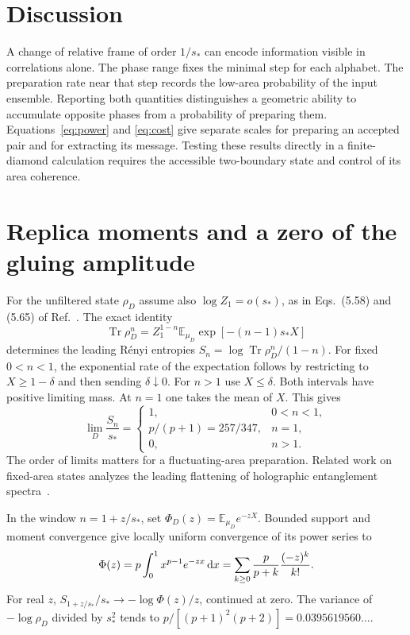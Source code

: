\documentclass[11pt,letterpaper]{article}
\newcommand{\Tr}{\operatorname{Tr}}
\newcommand{\dd}{\mathop{}\!{\rm d}}
\newcommand{\E}{\mathbb E}
\newcommand{\sg}{s_*}
\begin{document}
\section{Discussion}
A change of relative frame of order $1/\sg$ can encode information visible in correlations alone. The phase range fixes the minimal step for each alphabet. The preparation rate near that step records the low-area probability of the input ensemble. Reporting both quantities distinguishes a geometric ability to accumulate opposite phases from a probability of preparing them. Equations~\eqref{eq:power} and \eqref{eq:cost} give separate scales for preparing an accepted pair and for extracting its message. Testing these results directly in a finite-diamond calculation requires the accessible two-boundary state and control of its area coherence.

\appendix
\section{Replica moments and a zero of the gluing amplitude}
For the unfiltered state $\rho_D$ assume also $\log Z_1=o(\sg)$, as in Eqs.~(5.58) and (5.65) of Ref.~\cite{chandra}. The exact identity
\[
 \Tr\rho_D^n=Z_1^{1-n}\E_{\mu_D}\exp[-(n-1)\sg X]
\]
determines the leading R\'enyi entropies $S_n=\log\Tr\rho_D^n/(1-n)$. For fixed $0<n<1$, the exponential rate of the expectation follows by restricting to $X\geq1-\delta$ and then sending $\delta\downarrow0$. For $n>1$ use $X\leq\delta$. Both intervals have positive limiting mass. At $n=1$ one takes the mean of $X$. This gives
\begin{equation}
 \lim_{D}\frac{S_n}{\sg}=
 \begin{cases}
 1,&0<n<1,\\
 p/(p+1)=257/347,&n=1,\\
 0,&n>1 .
 \end{cases}
\end{equation}
The order of limits matters for a fluctuating-area preparation. Related work on fixed-area states analyzes the leading flattening of holographic entanglement spectra~\cite{dong}.

In the window $n=1+z/\sg$, set $\Phi_D(z)=\E_{\mu_D}e^{-zX}$. Bounded support and moment convergence give locally uniform convergence of its power series to
\begin{equation}
 \Phi(z)=p\int_0^1 x^{p-1}e^{-zx}\dd x
     =\sum_{k\geq0}\frac{p}{p+k}\frac{(-z)^k}{k!}.
\end{equation}
For real $z$, $S_{1+z/\sg}/\sg\to-\log\Phi(z)/z$, continued at zero. The variance of $-\log\rho_D$ divided by $\sg^2$ tends to $p/[(p+1)^2(p+2)]=0.0395619560\ldots$.
\end{document}
